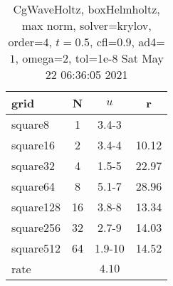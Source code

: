 \begin{table}[H]\tableFont %
\begin{center}
\begin{tabular}{|l|c|c|c|} \hline 
grid  & N &  $ u $ & r \\ \hline 
   square8 &     1 & \num{3.4}{-3} &        \\ \hline
  square16 &     2 & \num{3.4}{-4} & 10.12  \\ \hline
  square32 &     4 & \num{1.5}{-5} & 22.97  \\ \hline
  square64 &     8 & \num{5.1}{-7} & 28.96  \\ \hline
 square128 &    16 & \num{3.8}{-8} & 13.34  \\ \hline
 square256 &    32 & \num{2.7}{-9} & 14.03  \\ \hline
 square512 &    64 & \num{1.9}{-10} & 14.52  \\ \hline
    rate             &       &  $4.10$       &       \\ \hline
\end{tabular}
\caption{CgWaveHoltz, boxHelmholtz, max norm, solver=krylov, order=$4$, $t=0.5$, cfl=$0.9$, ad4=$1$, omega=2, tol=1e-8 Sat May 22 06:36:05 2021}\label{table:boxHelmholtzkrylovOrder4max}
\end{center}
\end{table}
